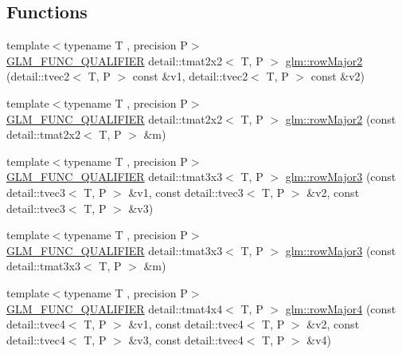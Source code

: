 \subsection*{Functions}
\begin{DoxyCompactItemize}
\item 
{\footnotesize template$<$typename T , precision P$>$ }\\\hyperlink{setup_8hpp_a33fdea6f91c5f834105f7415e2a64407}{G\+L\+M\+\_\+\+F\+U\+N\+C\+\_\+\+Q\+U\+A\+L\+I\+F\+I\+ER} detail\+::tmat2x2$<$ T, P $>$ \hyperlink{group__gtx__matrix__major__storage_ga63d72819ad07f4f875a0565f1462652b}{glm\+::row\+Major2} (detail\+::tvec2$<$ T, P $>$ const \&v1, detail\+::tvec2$<$ T, P $>$ const \&v2)
\item 
{\footnotesize template$<$typename T , precision P$>$ }\\\hyperlink{setup_8hpp_a33fdea6f91c5f834105f7415e2a64407}{G\+L\+M\+\_\+\+F\+U\+N\+C\+\_\+\+Q\+U\+A\+L\+I\+F\+I\+ER} detail\+::tmat2x2$<$ T, P $>$ \hyperlink{group__gtx__matrix__major__storage_ga5e3cee7cdc09b9ebf0e072247a5eac54}{glm\+::row\+Major2} (const detail\+::tmat2x2$<$ T, P $>$ \&m)
\item 
{\footnotesize template$<$typename T , precision P$>$ }\\\hyperlink{setup_8hpp_a33fdea6f91c5f834105f7415e2a64407}{G\+L\+M\+\_\+\+F\+U\+N\+C\+\_\+\+Q\+U\+A\+L\+I\+F\+I\+ER} detail\+::tmat3x3$<$ T, P $>$ \hyperlink{group__gtx__matrix__major__storage_gaacbbf46215dff1c3da9599916ba04a94}{glm\+::row\+Major3} (const detail\+::tvec3$<$ T, P $>$ \&v1, const detail\+::tvec3$<$ T, P $>$ \&v2, const detail\+::tvec3$<$ T, P $>$ \&v3)
\item 
{\footnotesize template$<$typename T , precision P$>$ }\\\hyperlink{setup_8hpp_a33fdea6f91c5f834105f7415e2a64407}{G\+L\+M\+\_\+\+F\+U\+N\+C\+\_\+\+Q\+U\+A\+L\+I\+F\+I\+ER} detail\+::tmat3x3$<$ T, P $>$ \hyperlink{group__gtx__matrix__major__storage_gafb5e7381b2451a85db394c457c284fb7}{glm\+::row\+Major3} (const detail\+::tmat3x3$<$ T, P $>$ \&m)
\item 
{\footnotesize template$<$typename T , precision P$>$ }\\\hyperlink{setup_8hpp_a33fdea6f91c5f834105f7415e2a64407}{G\+L\+M\+\_\+\+F\+U\+N\+C\+\_\+\+Q\+U\+A\+L\+I\+F\+I\+ER} detail\+::tmat4x4$<$ T, P $>$ \hyperlink{group__gtx__matrix__major__storage_gaba5dbb8fa29fcf57c80daf43ca7cf9db}{glm\+::row\+Major4} (const detail\+::tvec4$<$ T, P $>$ \&v1, const detail\+::tvec4$<$ T, P $>$ \&v2, const detail\+::tvec4$<$ T, P $>$ \&v3, const detail\+::tvec4$<$ T, P $>$ \&v4)

\end{DoxyCompactItemize}
